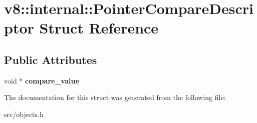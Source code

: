 \hypertarget{structv8_1_1internal_1_1_pointer_compare_descriptor}{}\section{v8\+:\+:internal\+:\+:Pointer\+Compare\+Descriptor Struct Reference}
\label{structv8_1_1internal_1_1_pointer_compare_descriptor}
\subsection*{Public Attributes}
\begin{DoxyCompactItemize}
\item 
\hypertarget{structv8_1_1internal_1_1_pointer_compare_descriptor_ab1b8f5c14b3aa3b4f6dd2451c64461c4}{}void $\ast$ {\bfseries compare\+\_\+value}\label{structv8_1_1internal_1_1_pointer_compare_descriptor_ab1b8f5c14b3aa3b4f6dd2451c64461c4}

\end{DoxyCompactItemize}


The documentation for this struct was generated from the following file\+:\begin{DoxyCompactItemize}
\item 
src/objects.\+h\end{DoxyCompactItemize}
